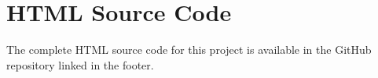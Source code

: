 \documentclass[12pt,a4paper]{report}
\begin{document}


\section{HTML Source Code}
The complete HTML source code for this project is available in the GitHub repository linked in the footer.

\thispagestyle{githubpage}



























\end{document}
